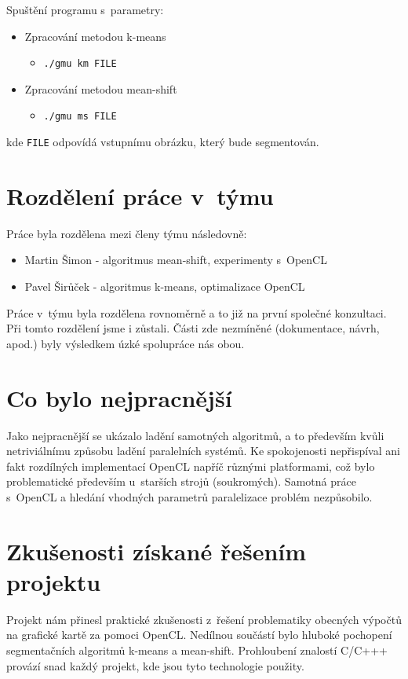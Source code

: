 \documentclass[11pt,a4paper]{article}
\begin{document}
Spuštění programu s~parametry:
\begin{itemize}
  \item Zpracování metodou k-means 
    \begin{itemize}
      \item[] \texttt{./gmu km FILE}
    \end{itemize}
  \item Zpracování metodou mean-shift
    \begin{itemize}
      \item[] \texttt{./gmu ms FILE}
    \end{itemize}
\end{itemize}
kde \texttt{FILE} odpovídá vstupnímu obrázku, který bude segmentován.


\section{Rozdělení práce v~týmu}
Práce byla rozdělena mezi členy týmu následovně:
\begin{itemize}
\item Martin Šimon - algoritmus mean-shift, experimenty s~OpenCL
\item Pavel Širůček - algoritmus k-means, optimalizace OpenCL
\end{itemize}

Práce v~týmu byla rozdělena rovnoměrně a to již na první společné konzultaci. Při tomto rozdělení jsme i zůstali. Části zde nezmíněné (dokumentace, návrh, apod.) byly výsledkem úzké spolupráce nás obou.

\section{Co bylo nejpracnější}
Jako nejpracnější se ukázalo ladění samotných algoritmů, a to především kvůli netriviálnímu způsobu ladění paralelních systémů. Ke spokojenosti nepřispíval ani fakt rozdílných implementací OpenCL napříč různými platformami, což bylo problematické především u~starších strojů (soukromých). Samotná práce s~OpenCL a hledání vhodných parametrů paralelizace problém nezpůsobilo.

\section{Zkušenosti získané řešením projektu}
Projekt nám přinesl praktické zkušenosti z~řešení problematiky obecných výpočtů na grafické kartě za pomoci OpenCL. Nedílnou součástí bylo hluboké pochopení segmentačních algoritmů k-means a mean-shift. Prohloubení znalostí C/C+++ provází snad každý projekt, kde jsou tyto technologie použity.
\end{document}
